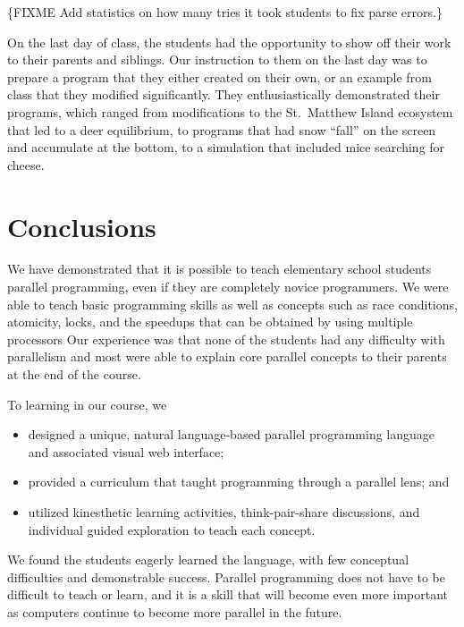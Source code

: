 \documentclass{sig-alternate}
\newcommand{\FIXME}[1]{{\color{red}\{FIXME #1\}}}
\begin{document}
\FIXME{Add statistics on how many tries it took students to fix parse errors.}

On the last day of class, the students had the opportunity to show off their work to their
parents and siblings. Our instruction to them on the last day was to prepare a program that
they either created on their own, or an example from class that they modified significantly.
They enthusiastically demonstrated their programs, which ranged from modifications to the St.~Matthew 
Island ecosystem that led to a deer equilibrium, to programs that had snow ``fall'' on
the screen and accumulate at the bottom, to a simulation that included mice searching for cheese.

\section{Conclusions}
We have demonstrated that it is possible to teach elementary school students parallel programming,
even if they are completely novice programmers. 
We were able to teach basic programming skills as well as concepts such as race conditions, 
atomicity, locks, and the speedups that can be obtained by using multiple processors
Our experience was that none of the students had any difficulty with parallelism
and most were able to explain core parallel concepts to their parents at the end of the course.

To learning in our course, we
\begin{itemize}\itemsep=0pt \topsep=0pt
\item designed a unique, natural language-based parallel programming language and associated visual web interface;
\item provided a curriculum that taught programming through a parallel lens; and
\item utilized kinesthetic learning activities, think-pair-share discussions, and individual guided exploration to teach each concept.
\end{itemize}
We found the students eagerly learned the language, with few conceptual difficulties and demonstrable success.  
Parallel programming does not have to be difficult to teach or learn,
and it is a skill that will become even more important as computers continue to become more
parallel in the future.
\newpage

\end{document}
